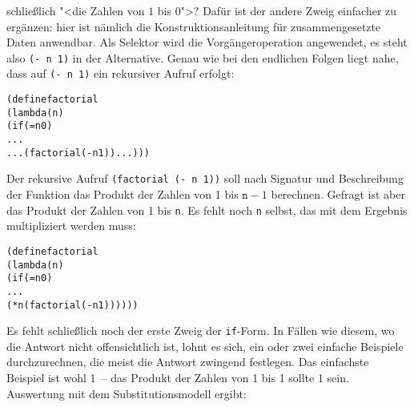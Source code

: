 schließlich "<die Zahlen von $1$ bis $0$">?  Dafür ist der andere Zweig
einfacher zu ergänzen: hier ist nämlich die Konstruktionsanleitung für
zusammengesetzte Daten anwendbar.  Als Selektor wird die
Vorgängeroperation angewendet, es steht also \texttt{(- n 1)} in der
Alternative.
Genau wie bei den endlichen Folgen liegt nahe, dass auf \texttt{(- n 1)} ein
rekursiver Aufruf erfolgt:
%
\begin{alltt}
(define factorial
  (lambda (n)
    (if (= n 0)
        ...
        ... (factorial (- n 1)) ...)))
\end{alltt}
%
Der rekursive Aufruf \texttt{(factorial (- n 1))} soll nach
Signatur und Beschreibung der Funktion das Produkt der Zahlen von 1 bis
$\texttt{n}-1$ berechnen.  Gefragt ist aber das Produkt der Zahlen von
1 bis \texttt{n}.  Es fehlt noch \texttt{n} selbst, das mit dem
Ergebnis multipliziert werden muss:
%
\begin{alltt}
(define factorial
  (lambda (n)
    (if (= n 0)
        ...
        (* n (factorial (- n 1))))))
\end{alltt}
%
Es fehlt schließlich noch der erste Zweig der \texttt{if}-Form.  In
Fällen wie diesem, wo die Antwort nicht offensichtlich ist,
lohnt es sich, ein oder zwei einfache Beispiele durchzurechnen, die meist die
Antwort zwingend festlegen.  Das einfachste Beispiel ist wohl 1~--
das Produkt der Zahlen von 1 bis 1 sollte 1 sein.  Auswertung mit dem
Substitutionsmodell ergibt:

